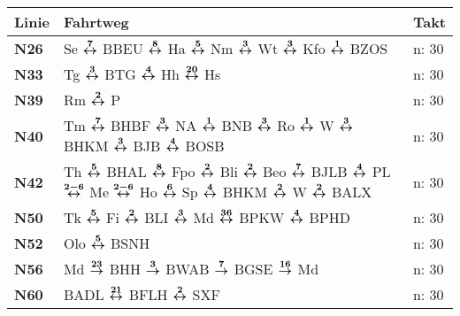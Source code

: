 \begin{minipage}[t]{0.45\textwidth}
\begin{tabular}{>{\bfseries}L{1.2cm}L{9.0cm}L{3.0cm}}
{\bfseries Linie} & {\bfseries Fahrtweg} & {\bfseries Takt} \\
\hline
\nbus{} N26   & Se $\xarwe{7}$ BBEU $\xarwe{8}$ Ha $\xarwe{5}$ Nm $\xarwe{3}$ Wt $\xarwe{3}$ Kfo $\xarwe{1}$ BZOS                                                                   & n: 30                      \\
\nbus{} N33   & Tg $\xarwe{3}$ BTG $\xarwe{4}$ Hh $\xarwe{20}$ Hs                                                                                                                   & n: 30                      \\
\nbus{} N39   & Rm $\xarwe{2}$ P                                                                                                                                                    & n: 30                      \\
\nbus{} N40   & Tm $\xarwe{7}$ BHBF $\xarwe{3}$ NA $\xarwe{1}$ BNB $\xarwe{3}$ Ro $\xarwe{1}$ W $\xarwe{3}$ BHKM $\xarwe{3}$ BJB $\xarwe{4}$ BOSB                                   & n: 30                      \\
\nbus{} N42   & Th $\xarwe{5}$ BHAL $\xarwe{8}$ Fpo $\xarwe{2}$ Bli $\xarwe{2}$ Beo $\xarwe{7}$ BJLB $\xarwe{4}$ PL $\xarwe{2-6}$ Me $\xarwe{2-6}$ Ho $\xarwe{6}$ Sp $\xarwe{4}$    %
                BHKM $\xarwe{2}$ W $\xarwe{2}$ BALX                                                                                                                                 & n: 30                      \\
\nbus{} N50   & Tk $\xarwe{5}$ Fi $\xarwe{2}$ BLI $\xarwe{3}$ Md $\xarwe{36}$ BPKW $\xarwe{4}$ BPHD                                                                                 & n: 30                      \\
\nbus{} N52   & Olo $\xarwe{5}$ BSNH                                                                                                                                                & n: 30                      \\
\nbus{} N56   & Md $\xarre{23}$ BHH $\xarre{3}$ BWAB $\xarre{7}$ BGSE $\xarre{16}$ Md                                                                                               & n: 30                      \\
\nbus{} N60   & BADL $\xarwe{21}$ BFLH $\xarwe{2}$ SXF                                                                                                                              & n: 30                      \\

\end{tabular}
\end{minipage}
